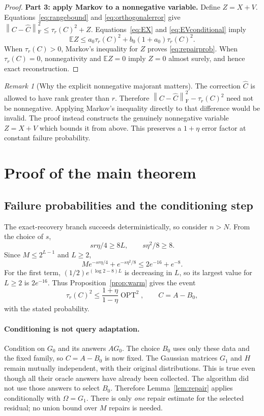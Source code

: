 \documentclass[11pt]{article}
\numberwithin{equation}{section}
\theoremstyle{remark}
\newtheorem{remark}[theorem]{Remark}
\newcommand{\E}{\mathbb E}
\newcommand{\OPT}{\operatorname{OPT}}
\newcommand{\norm}[1]{\left\lVert #1\right\rVert_{\mathrm F}}
\begin{document}
\begin{proof}
\textbf{Part 3: apply Markov to a nonnegative variable.}
Define $Z=X+V$. Equations~\eqref{eq:rangebound} and \eqref{eq:orthogonalerror} give
$\norm{C-\widehat C}^2\le\tau_r(C)^2+Z$.
Equations~\eqref{eq:EX} and \eqref{eq:EVconditional} imply
\[
 \E Z\le a_0\tau_r(C)^2+b_0(1+a_0)\tau_r(C)^2.
\]
When $\tau_r(C)>0$, Markov's inequality for $Z$ proves \eqref{eq:repairprob}.
When $\tau_r(C)=0$, nonnegativity and $\E Z=0$ imply $Z=0$ almost surely, and hence exact reconstruction.
\end{proof}

\begin{remark}[Why the explicit nonnegative majorant matters]\label{rem:markov}
The correction $\widehat C$ is allowed to have rank greater than $r$.
Therefore $\norm{C-\widehat C}^2-\tau_r(C)^2$ need not be nonnegative. Applying Markov's inequality directly to that difference would be invalid. The proof instead constructs the genuinely nonnegative variable $Z=X+V$ which bounds it from above. This preserves a $1+\eta$ error factor at constant failure probability.
\end{remark}

\section{Proof of the main theorem}\label{sec:mainproof}

\subsection{Failure probabilities and the conditioning step}
The exact-recovery branch succeeds deterministically, so consider $n>N$.
From the choice of $s$,
\[
 sr\eta/4\ge8L,\qquad s\eta^2/8\ge8.
\]
Since $M\le2^{L-1}$ and $L\ge2$,
\begin{equation}\label{eq:warmfailureexplicit}
 M e^{-sr\eta/4}+e^{-s\eta^2/8}
 \le 2e^{-16}+e^{-8}.
\end{equation}
For the first term, $(1/2)e^{(\log2-8)L}$ is decreasing in $L$, so its largest value for $L\ge2$ is $2e^{-16}$.
Thus Proposition~\ref{prop:warm} gives the event
\begin{equation}\label{eq:goodwarm}
 \tau_r(C)^2\le\frac{1+\eta}{1-\eta}\OPT^2,
 \qquad C=A-B_0,
\end{equation}
with the stated probability.

\paragraph{Conditioning is not query adaptation.}
Condition on $G_0$ and its answers $AG_0$. The choice $B_0$ uses only these data and the fixed family, so $C=A-B_0$ is now fixed. The Gaussian matrices $G_1$ and $H$ remain mutually independent, with their original distributions. This is true even though all their oracle answers have already been collected. The algorithm did not use those answers to select $B_0$.
Therefore Lemma~\ref{lem:repair} applies conditionally with $\Omega=G_1$.
There is only \emph{one} repair estimate for the selected residual; no union bound over $M$ repairs is needed.
\end{document}
